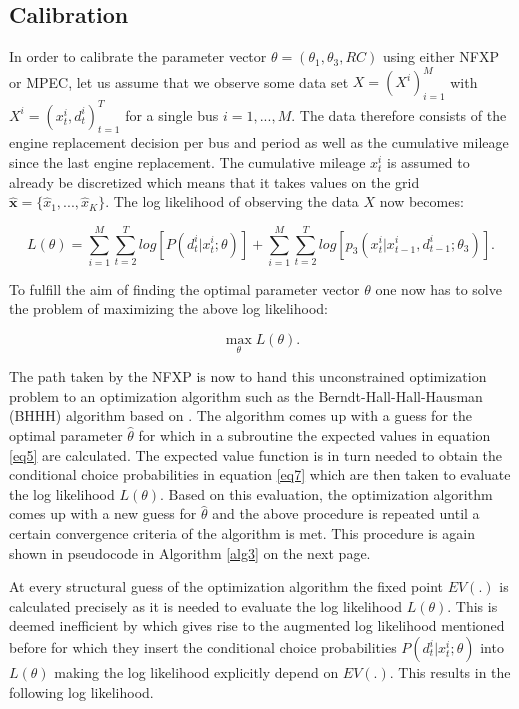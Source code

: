 \subsection{Calibration}

In order to calibrate the parameter vector $\theta =(\theta_1, \theta_3, RC)$ using either NFXP or MPEC, let us assume that we observe some data set $X = (X^i)^M_{i=1 }$ with $X^i = (x^i_t, d^i_t)^T_{t=1}$ for a single bus $i = 1, ..., M$. The data therefore consists of the engine replacement decision per bus and period as well as the cumulative mileage since the last engine replacement. The cumulative mileage $x^i_t$ is assumed to already be discretized which means that it takes values on the grid $\mathbf{\hat x} = \{\hat x_1, ..., \hat x_K\}$. The log likelihood of observing the data $X$ now becomes:

\begin{equation}
	L(\theta) = \sum_{i=1}^{M} \sum_{t=2}^{T} log[P(d^i_t|x^i_t; \theta)] + \sum_{i=1}^{M} \sum_{t=2}^{T} log[p_3(x^i_t|x^i_{t-1}, d^i_{t-1}; \theta_3)].
\end{equation}

To fulfill the aim of finding the optimal parameter vector $\theta$ one now has to solve the problem of maximizing the above log likelihood:

\begin{equation}
	\max_{\theta} L(\theta).
\end{equation}

The path taken by the NFXP is now to hand this unconstrained optimization problem to an optimization algorithm such as the Berndt-Hall-Hall-Hausman (BHHH) algorithm based on \cite{Berndt.1974}. The algorithm comes up with a guess for the optimal parameter $\hat \theta$ for which in a subroutine the expected values in equation \ref{eq5} are calculated. The expected value function is in turn needed to obtain the conditional choice probabilities in equation \ref{eq7} which are then taken to evaluate the log likelihood $L(\theta)$. Based on this evaluation, the optimization algorithm comes up with a new guess for $\hat \theta$ and the above procedure is repeated until a certain convergence criteria of the algorithm is met. This procedure is again shown in pseudocode in Algorithm \ref{alg3} on the next page.

At every structural guess of the optimization algorithm the fixed point $EV(.)$ is calculated precisely as it is needed to evaluate the log likelihood $L(\theta)$. This is deemed inefficient by \citeauthor{Su.Judd.2012} which gives rise to the augmented log likelihood mentioned before for which they insert the conditional choice probabilities $P(d^i_t|x^i_t; \theta)$ into $L(\theta)$ making the log likelihood explicitly depend on $EV(.)$. This results in the following log likelihood.

